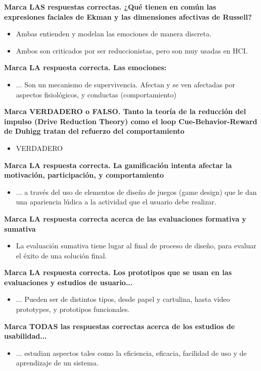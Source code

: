 \documentclass[12pt, twoside, openright]{report} %
\begin{document}
\textbf{Marca LAS respuestas correctas. ¿Qué tienen en común las expresiones faciales de Ekman y las dimensiones afectivas de Russell?}
\begin{itemize}
	\item Ambas entienden y modelan las emociones de manera discreta.
	\item Ambos son criticados por ser reduccionistas, pero son muy usadas en HCI.
\end{itemize}

\textbf{Marca LA respuesta correcta. Las emociones:}
\begin{itemize}
	\item ... Son un mecanismo de supervivencia. Afectan y se ven afectadas por aspectos fisiológicos, y conductas (comportamiento)
\end{itemize}

\textbf{Marca VERDADERO o FALSO. Tanto la teoría de la reducción del impulso (Drive Reduction Theory) como el loop Cue-Behavior-Reward de Duhigg tratan del refuerzo del comportamiento}
\begin{itemize}
	\item VERDADERO
\end{itemize}

\textbf{Marca LA respuesta correcta. La gamificación intenta afectar la motivación, participación, y comportamiento}
\begin{itemize}
	\item ... a través del uso de elementos de diseño de juegos (game design) que le dan una apariencia lúdica a la actividad que el usuario debe realizar.
\end{itemize}

\textbf{Marca LA respuesta correcta acerca de las evaluaciones formativa y sumativa}
\begin{itemize}
	\item La evaluación sumativa tiene lugar al final de proceso de diseño, para evaluar el éxito de una solución final.
\end{itemize}

\textbf{Marca LA respuesta correcta. Los prototipos que se usan en las evaluaciones y estudios de usuario...}
\begin{itemize}
	\item ... Pueden ser de distintos tipos, desde papel y cartulina, hasta video prototypes, y prototipos funcionales.
\end{itemize}

\textbf{Marca TODAS las respuestas correctas acerca de los estudios de usabilidad...}
\begin{itemize}
	\item ... estudian aspectos tales como la eficiencia, eficacia, facilidad de uso y de aprendizaje de un sistema.
\end{itemize}
\end{document}
